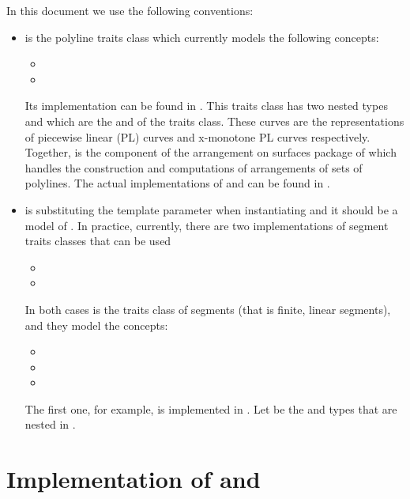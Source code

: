 \documentclass[a4paper,10pt]{article}
\begin{document}
In this document we use the following conventions:
\begin{itemize}
%
\item \href{http://doc.cgal.org/4.2/CGAL.CGAL.2D-Arrangements/html/classCGAL_1_1Arr__polyline__traits__2.html}{\polytr} is the polyline traits class which currently models the following concepts:
  \begin{itemize}
  \item {}
  \item {}
  \end{itemize}
  Its implementation can be found in .
  This traits class has two nested types \poly and \xpoly which are the  and  of the traits class.
  These curves are the representations of piecewise linear (PL) curves and x-monotone PL curves respectively.
  Together, \polytr is the component of the arrangement on surfaces package of \cgal which handles the construction and computations of arrangements of  sets of polylines.
  The actual implementations of \poly and \xpoly can be found in .
%
\item \segtr is substituting the template parameter when instantiating \polytr and it should be a model of .
  In practice, currently, there are two implementations of segment traits classes that can be used
  \begin{itemize}
  \item {}
  \item {}
  \end{itemize}
  In both cases \segtr is the traits class of segments (that is finite, linear segments), and they model the concepts:
  \begin{itemize}
  \item {}
  \item {}
  \item {}
  \end{itemize}
  The first one, for example, is implemented in .
  Let \seg be the  and  types that are nested in \segtr.
\end{itemize}

\section{Implementation of \poly and \xpoly}
\label{sec:implementation-poly}
\end{document}
